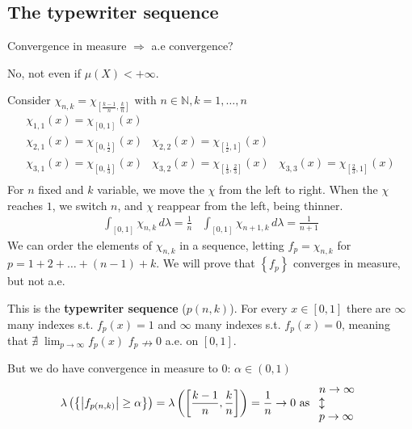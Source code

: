 \subsection{The typewriter sequence}
\begin{remark}
    Convergence in measure \(\Rightarrow\) a.e convergence?

    No, not even if \(\mu(X) < +\infty\).

    Consider \(\chi_{n,k} = \chi_{[\frac{k-1}{n}, \frac{k}{n}]}\) with \(n \in \mathbb{N}, k = 1, \ldots, n\)
    \[
        \begin{array}{ccc}
            \chi_{1,1}(x) = \chi_{[0, 1]}(x) & & \\
            \chi_{2,1}(x) = \chi_{[0, \frac{1}{2}]}(x) & \chi_{2,2}(x) = \chi_{[\frac{1}{2}, 1]}(x) & \\
            \chi_{3,1}(x) = \chi_{[0, \frac{1}{3}]}(x) & \chi_{3,2}(x) = \chi_{[\frac{1}{3}, \frac{2}{3}]}(x) &\chi_{3,3}(x) = \chi_{[\frac{2}{3}, 1]}(x) \\
        \end{array}
    \]
    For \(n\) fixed and \(k\) variable, we move the \(\chi\) from the left to right. When the \(\chi\) reaches \(1\), we switch \(n\), and \(\chi\) reappear from the left, being thinner. 
    \[
        \begin{array}{cc}
            \int_{[0,1]} \chi_{n,k} \, d\lambda = \frac{1}{n} & \int_{[0,1]} \chi_{n+1, k} \, d\lambda = \frac{1}{n+1}
        \end{array}
    \]
    We can order the elements of \(\chi_{n,k}\) in a sequence, letting
    \(f_p = \chi_{n,k}\) for \(p=1+2+\ldots+(n-1)+k\). We will prove that \(\left\{ f_p \right\}\) converges in measure, but not a.e. 

    This is the \textbf{typewriter sequence} (\(p(n,k)\)). For every \(x \in [0,1]\) there are \(\infty\) many indexes s.t. \(f_p(x) = 1\) and \(\infty\) many indexes s.t. \(f_p(x) = 0\), meaning that \(\nexists \; \lim_{p\to \infty} f_p(x)\)
    \( f_p \nrightarrow 0 \) a.e. on \(\left[ 0, 1\right]\).

    But we do have convergence in measure to \(0\): \(\alpha \in (0,1)\)
    \[
        \lambda\left(\left\{ \abs{f_{p(n,k)}} \geq \alpha \right\}\right) = \lambda \left(\left[ \frac{k-1}{n}, \frac{k}{n} \right]\right) = \frac{1}{n} \to 0 \mbox{ as } \begin{array}{l}
            n\to \infty \\
            \updownarrow \\
            p \to \infty        
        \end{array}
    \]
\end{remark}
